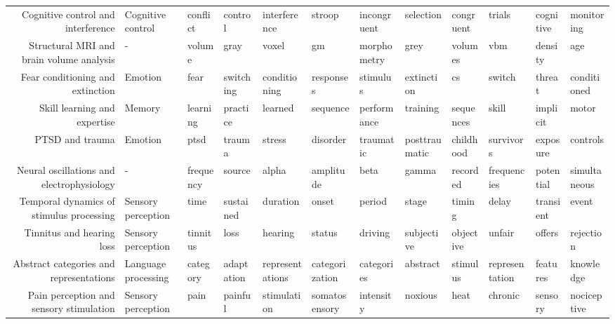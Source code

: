 \begin{tabular}{rlllllllllll}
                Cognitive control and interference &   Cognitive control &         conflict &       control &    interference &         stroop & incongruent &      selection &     congruent &         trials &     cognitive &     monitoring \\
          Structural MRI and brain volume analysis &                   - &           volume &          gray &           voxel &             gm & morphometry &           grey &       volumes &            vbm &       density &            age \\
                  Fear conditioning and extinction &             Emotion &             fear &     switching &    conditioning &      responses &    stimulus &     extinction &            cs &         switch &        threat &    conditioned \\
                      Skill learning and expertise &              Memory &         learning &      practice &         learned &       sequence & performance &       training &     sequences &          skill &      implicit &          motor \\
                                   PTSD and trauma &             Emotion &             ptsd &        trauma &          stress &       disorder &   traumatic &  posttraumatic &     childhood &      survivors &      exposure &       controls \\
         Neural oscillations and electrophysiology &                   - &        frequency &        source &           alpha &      amplitude &        beta &          gamma &      recorded &    frequencies &     potential &   simultaneous \\
          Temporal dynamics of stimulus processing &  Sensory perception &             time &     sustained &        duration &          onset &      period &          stage &        timing &          delay &     transient &          event \\
                         Tinnitus and hearing loss &  Sensory perception &         tinnitus &          loss &         hearing &         status &     driving &     subjective &     objective &         unfair &        offers &      rejection \\
           Abstract categories and representations & Language processing &         category &    adaptation & representations & categorization &  categories &       abstract &      stimulus & representation &      features &      knowledge \\
           Pain perception and sensory stimulation &  Sensory perception &             pain &       painful &     stimulation &  somatosensory &   intensity &        noxious &          heat &        chronic &       sensory &    nociceptive \\

\end{tabular}
